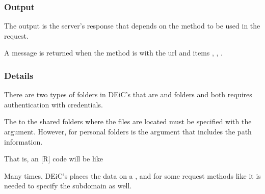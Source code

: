 \documentclass[a4paper,12pt,english]{sphinxhowto}
\begin{document}
\subsubsection{Output}
\label{\detokenize{Sciencedata_dk:output}}
The output is the server’s response that depends on the method to be used in the request.

A  message is returned when the method is  with the url and items
, , .



\subsubsection{Details}
\label{\detokenize{Sciencedata_dk:details}}
There are two types of folders in DEiC’s  that are 
and  folders and both requires authentication with credentials.

The  to the shared folders where the files are located must be specified with the  argument.
However, for personal folders is the  argument that includes the path information.

That is, an {[}R{]} code will be like

\begin{sphinxVerbatim}[commandchars=\\\{\},formatcom=\footnotesize]
 

  
\end{sphinxVerbatim}

Many times, DEiC’s  places the data on a , and
for some request methods like  it is needed to specify the subdomain as well.
\end{document}
